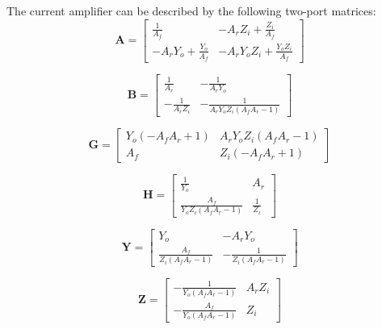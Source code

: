 \documentclass[a4paper, 12pt]{article}
\newcommand{\mat}[1]{\mathbf{#1}}
\begin{document}
The current amplifier can be described by the following two-port
matrices:
\begin{equation}
\mat{A} = \left[\begin{matrix}\frac{1}{A_{f}} & - A_{r} Z_{i} + \frac{Z_{i}}{A_{f}}\\- A_{r} Y_{o} + \frac{Y_{o}}{A_{f}} & - A_{r} Y_{o} Z_{i} + \frac{Y_{o} Z_{i}}{A_{f}}\end{matrix}\right]
\end{equation}

\begin{equation}
\mat{B} = \left[\begin{matrix}\frac{1}{A_{r}} & - \frac{1}{A_{r} Y_{o}}\\- \frac{1}{A_{r} Z_{i}} & - \frac{1}{A_{r} Y_{o} Z_{i} \left(A_{f} A_{r} - 1\right)}\end{matrix}\right]
\end{equation}

\begin{equation}
\mat{G} = \left[\begin{matrix}Y_{o} \left(- A_{f} A_{r} + 1\right) & A_{r} Y_{o} Z_{i} \left(A_{f} A_{r} - 1\right)\\A_{f} & Z_{i} \left(- A_{f} A_{r} + 1\right)\end{matrix}\right]
\end{equation}

\begin{equation}
\mat{H} = \left[\begin{matrix}\frac{1}{Y_{o}} & A_{r}\\\frac{A_{f}}{Y_{o} Z_{i} \left(A_{f} A_{r} - 1\right)} & \frac{1}{Z_{i}}\end{matrix}\right]
\end{equation}

\begin{equation}
\mat{Y} = \left[\begin{matrix}Y_{o} & - A_{r} Y_{o}\\\frac{A_{f}}{Z_{i} \left(A_{f} A_{r} - 1\right)} & - \frac{1}{Z_{i} \left(A_{f} A_{r} - 1\right)}\end{matrix}\right]
\end{equation}

\begin{equation}
\mat{Z} = \left[\begin{matrix}- \frac{1}{Y_{o} \left(A_{f} A_{r} - 1\right)} & A_{r} Z_{i}\\- \frac{A_{f}}{Y_{o} \left(A_{f} A_{r} - 1\right)} & Z_{i}\end{matrix}\right]
\end{equation}
\end{document}
